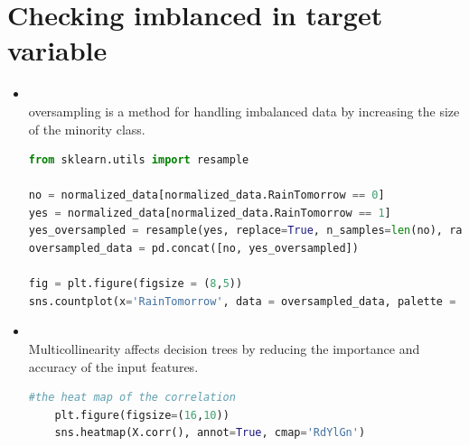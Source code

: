 \documentclass{article}
\begin{document}
\section{Checking imblanced in target variable}
\begin{itemize}
    \item \textbf{\textcolor{blue}{}}\\
    oversampling is a method for handling imbalanced data by increasing the size of the minority class.
    \begin{center}
    \begin{lstlisting}[language=Python, caption={Logistic Regression Example}, label={lst:logreg}, backgroundcolor=\color{gray!10}, frame=single, keywordstyle=\color{blue}\bfseries, commentstyle=\color{green!50!black}, stringstyle=\color{orange}]
from sklearn.utils import resample

no = normalized_data[normalized_data.RainTomorrow == 0]
yes = normalized_data[normalized_data.RainTomorrow == 1]
yes_oversampled = resample(yes, replace=True, n_samples=len(no), random_state=123)
oversampled_data = pd.concat([no, yes_oversampled])

fig = plt.figure(figsize = (8,5))
sns.countplot(x='RainTomorrow', data = oversampled_data, palette = "Set1").set(title='RainTomorrow Indicator No(0) and Yes(1) after Oversampling (Balanced Dataset)')
    \end{lstlisting}
    \end{center}
    
    \item \textbf{\textcolor{blue}{}}\\
    Multicollinearity affects decision trees by reducing the importance and accuracy of the input features.
    \begin{center}
    \begin{lstlisting}[language=Python, caption={Logistic Regression Example}, label={lst:logreg}, backgroundcolor=\color{gray!10}, frame=single, keywordstyle=\color{blue}\bfseries, commentstyle=\color{green!50!black}, stringstyle=\color{orange}]
    #the heat map of the correlation
    plt.figure(figsize=(16,10))
    sns.heatmap(X.corr(), annot=True, cmap='RdYlGn')
    \end{lstlisting}
    \end{center}
\end{itemize}
\end{document}
